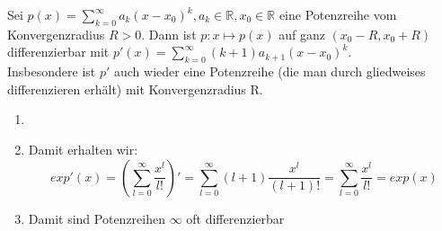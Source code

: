 \setcounter{Satz}{6} 
\begin{Satz}{
	Sei $p \left( x\right) = \sum_{k=0}^{ \infty}
	{ a_k \left( x-x_0\right)^k}, a_k \in 
	\mathbb{R} ,x_0 \in \mathbb{R}$ eine Potenzreihe vom Konvergenzradius 
	$R >0 $. Dann ist $p : x \mapsto p\left(x\right)$ auf ganz 
	$\left( x_0-R, x_0+R \right)$ differenzierbar mit 
	$p'\left( x \right) = \sum_{k=0}^\infty {\left( k+1\right) 
	a_{k+1} \left(x-x_0\right)^k}$.\\
	Insbesondere ist $p'$ auch wieder eine Potenzreihe 
	(die man durch gliedweises differenzieren erhält) mit	Konvergenzradius R.
}\end{Satz}

\begin{Bemerkung}{
	\begin{enumerate}
		\item[ ]
		\item Damit erhalten wir: 
		\begin{equation*}
			exp'\left(x\right) = \left( \sum_{l=0}^{\infty} \frac{x^l}{l!}\right)' 
			= \sum_{l=0}^{\infty} \left(l+1\right) \frac{x^l}{(l+1)!} 
			= \sum_{l=0}^{\infty} \frac{x^l}{l!} = exp(x)
		\end{equation*}
		\item Damit sind Potenzreihen $\infty$ oft differenzierbar
	\end{enumerate}
}\end{Bemerkung}

